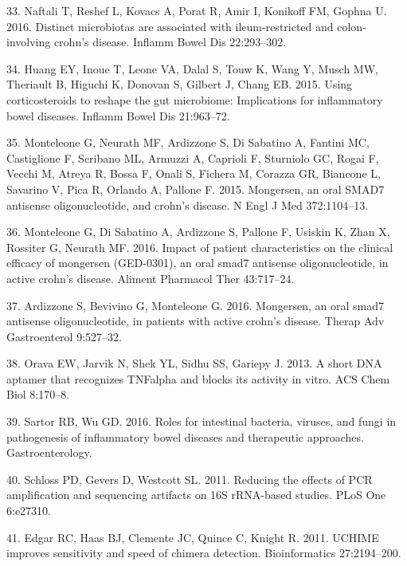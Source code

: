 \documentclass[11pt,]{article}
\begin{document}
\hypertarget{ref-naftali_tissinvol_2016}{}
33. Naftali T, Reshef L, Kovacs A, Porat R, Amir I, Konikoff FM, Gophna
U. 2016. Distinct microbiotas are associated with ileum-restricted and
colon-involving crohn's disease. Inflamm Bowel Dis 22:293--302.

\hypertarget{ref-huang_cort_2015}{}
34. Huang EY, Inoue T, Leone VA, Dalal S, Touw K, Wang Y, Musch MW,
Theriault B, Higuchi K, Donovan S, Gilbert J, Chang EB. 2015. Using
corticosteroids to reshape the gut microbiome: Implications for
inflammatory bowel diseases. Inflamm Bowel Dis 21:963--72.

\hypertarget{ref-monteleone_mongersen_2015}{}
35. Monteleone G, Neurath MF, Ardizzone S, Di Sabatino A, Fantini MC,
Castiglione F, Scribano ML, Armuzzi A, Caprioli F, Sturniolo GC, Rogai
F, Vecchi M, Atreya R, Bossa F, Onali S, Fichera M, Corazza GR, Biancone
L, Savarino V, Pica R, Orlando A, Pallone F. 2015. Mongersen, an oral
SMAD7 antisense oligonucleotide, and crohn's disease. N Engl J Med
372:1104--13.

\hypertarget{ref-monteleone_mongersen_2016}{}
36. Monteleone G, Di Sabatino A, Ardizzone S, Pallone F, Usiskin K, Zhan
X, Rossiter G, Neurath MF. 2016. Impact of patient characteristics on
the clinical efficacy of mongersen (GED-0301), an oral smad7 antisense
oligonucleotide, in active crohn's disease. Aliment Pharmacol Ther
43:717--24.

\hypertarget{ref-ardizzone_mongersen_2016}{}
37. Ardizzone S, Bevivino G, Monteleone G. 2016. Mongersen, an oral
smad7 antisense oligonucleotide, in patients with active crohn's
disease. Therap Adv Gastroenterol 9:527--32.

\hypertarget{ref-orava_short_2013}{}
38. Orava EW, Jarvik N, Shek YL, Sidhu SS, Gariepy J. 2013. A short DNA
aptamer that recognizes TNFalpha and blocks its activity in vitro. ACS
Chem Biol 8:170--8.

\hypertarget{ref-sartor_microbesIBD_2016}{}
39. Sartor RB, Wu GD. 2016. Roles for intestinal bacteria, viruses, and
fungi in pathogenesis of inflammatory bowel diseases and therapeutic
approaches. Gastroenterology.

\hypertarget{ref-schloss_PCRartifacts_2011}{}
40. Schloss PD, Gevers D, Westcott SL. 2011. Reducing the effects of PCR
amplification and sequencing artifacts on 16S rRNA-based studies. PLoS
One 6:e27310.

\hypertarget{ref-edgar_uchime_2011}{}
41. Edgar RC, Haas BJ, Clemente JC, Quince C, Knight R. 2011. UCHIME
improves sensitivity and speed of chimera detection. Bioinformatics
27:2194--200.
\end{document}
